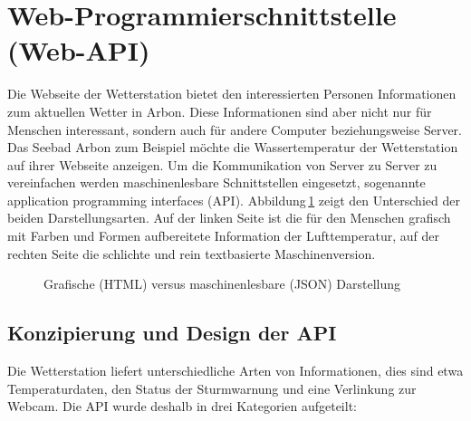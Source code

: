 \section{ Web-Programmierschnittstelle (Web-API)}
Die Webseite der Wetterstation bietet den interessierten Personen Informationen zum aktuellen Wetter in Arbon. Diese Informationen sind aber nicht nur für Menschen interessant, sondern auch für andere Computer beziehungsweise Server. Das Seebad Arbon zum Beispiel möchte die Wassertemperatur der Wetterstation auf ihrer Webseite anzeigen. Um die Kommunikation von Server zu Server zu vereinfachen werden maschinenlesbare Schnittstellen eingesetzt, sogenannte application programming interfaces (API). Abbildung\,\ref{img:humanvsmachine} zeigt den Unterschied der beiden Darstellungsarten. Auf der linken Seite ist die für den Menschen grafisch mit Farben und Formen aufbereitete Information der Lufttemperatur, auf der rechten Seite die schlichte und rein textbasierte Maschinenversion.

\begin{figure}[htbp!]
	\centering
	\caption{Grafische (HTML) versus maschinenlesbare (JSON) Darstellung}
	\label{img:humanvsmachine}
\end{figure}

\subsection{Konzipierung und Design der API}
Die Wetterstation liefert unterschiedliche Arten von Informationen, dies sind etwa Temperaturdaten, den Status der Sturmwarnung und eine Verlinkung zur Webcam. Die API wurde deshalb in drei Kategorien aufgeteilt:

